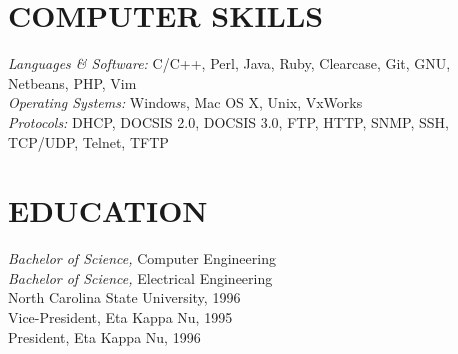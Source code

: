\documentclass[line,margin]{res}
\begin{document}
\begin{resume}
\section{COMPUTER SKILLS} {\sl Languages \& Software:} C/C++, Perl, Java,
                Ruby, Clearcase, Git, GNU, Netbeans, PHP, Vim \\
                {\sl Operating Systems:} Windows, Mac OS X, Unix, VxWorks \\ 
                {\sl Protocols:} DHCP, DOCSIS 2.0, DOCSIS 3.0, FTP, HTTP, SNMP, SSH, TCP/UDP, Telnet, TFTP

\section{EDUCATION} {\sl Bachelor of Science,} Computer Engineering \\
                    {\sl Bachelor of Science,} Electrical Engineering \\
                North Carolina State University, 1996 \\
                Vice-President, Eta Kappa Nu, 1995 \\ 
                President, Eta Kappa Nu, 1996 \\

\end{resume}
\end{document}
